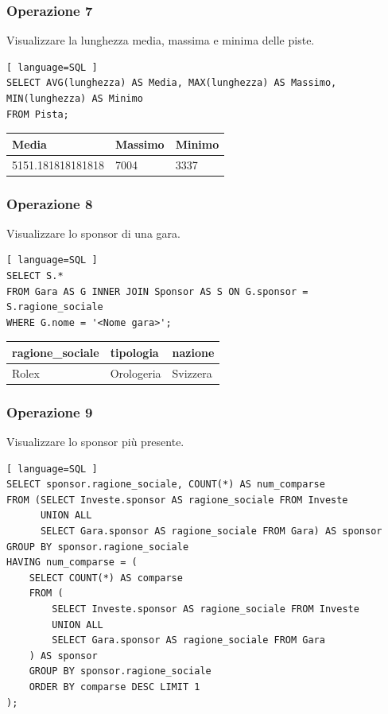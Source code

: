 \documentclass[11pt]{article}
\begin{document}
\subsubsection{Operazione 7}
Visualizzare la lunghezza media, massima e minima delle piste.
\begin{lstlisting}[ language=SQL ]
SELECT AVG(lunghezza) AS Media, MAX(lunghezza) AS Massimo, MIN(lunghezza) AS Minimo
FROM Pista;
\end{lstlisting}

\begin{table}[H]
    \centering
    \begin{tabular}{|l|l|l|}
    \hline
        \textbf{Media} & \textbf{Massimo} & \textbf{Minimo} \\ \hline
        5151.181818181818 & 7004 & 3337 \\ \hline
    \end{tabular}
\end{table}


\subsubsection{Operazione 8}
Visualizzare lo sponsor di una gara.
\begin{lstlisting}[ language=SQL ]
SELECT S.*
FROM Gara AS G INNER JOIN Sponsor AS S ON G.sponsor = S.ragione_sociale
WHERE G.nome = '<Nome gara>';
\end{lstlisting}

\begin{table}[H]
    \centering
    \begin{tabular}{|l|l|l|}
    \hline
        \textbf{ragione\_sociale} & \textbf{tipologia} & \textbf{nazione} \\ \hline
        Rolex & Orologeria & Svizzera \\ \hline
    \end{tabular}
\end{table}


\subsubsection{Operazione 9}
Visualizzare lo sponsor più presente.
\begin{lstlisting}[ language=SQL ]
SELECT sponsor.ragione_sociale, COUNT(*) AS num_comparse
FROM (SELECT Investe.sponsor AS ragione_sociale FROM Investe 
      UNION ALL 
      SELECT Gara.sponsor AS ragione_sociale FROM Gara) AS sponsor
GROUP BY sponsor.ragione_sociale
HAVING num_comparse = (
    SELECT COUNT(*) AS comparse
    FROM (
        SELECT Investe.sponsor AS ragione_sociale FROM Investe 
        UNION ALL 
        SELECT Gara.sponsor AS ragione_sociale FROM Gara
    ) AS sponsor
    GROUP BY sponsor.ragione_sociale
    ORDER BY comparse DESC LIMIT 1
);
\end{lstlisting}
\end{document}
